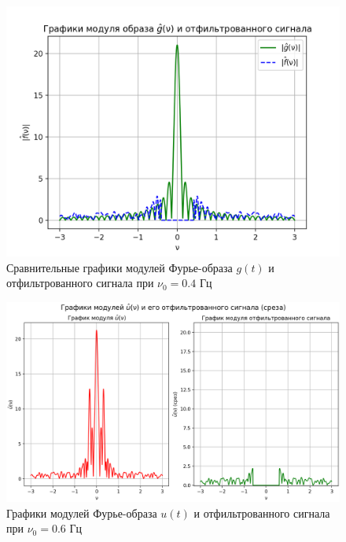 \begin{figure}[ht!]
    \centering
    \includegraphics[scale=0.55]{media/1 task/low_freq/Fourier_Image_Comparison_4_2_2_-0,4.png}
    \caption{Сравнительные графики модулей Фурье-образа $g(t)$ и отфильтрованного сигнала при $\nu_0=0.4$ Гц}
    \label{fig:fourc_4_2_2_0.4}
\end{figure}

\begin{figure}[ht!]
    \centering
    \includegraphics[scale=0.55]{media/1 task/low_freq/Fourier_Image_4_2_2-0,5975975975975976.png}
    \caption{Графики модулей Фурье-образа $u(t)$ и отфильтрованного сигнала при $\nu_0=0.6$ Гц}
    \label{fig:four_4_2_2_0.6}
\end{figure}

